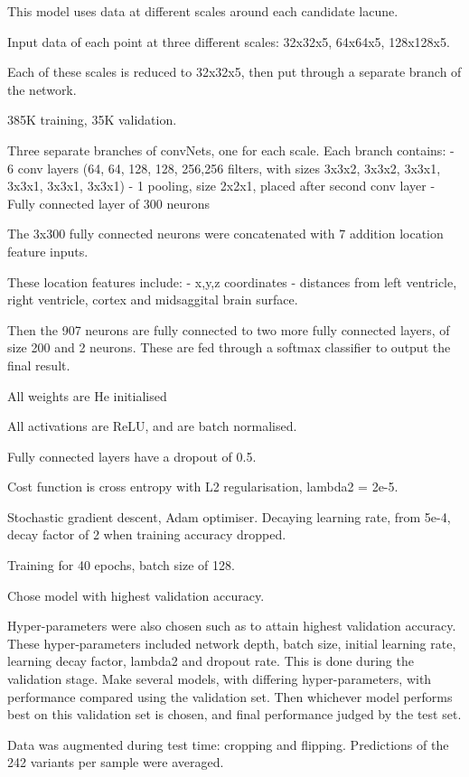 \documentclass[honours,12pt]{unswthesis}
\numberwithin{equation}{section}
\begin{document}
This model uses data at different scales around each candidate lacune. 

Input data of each point at three different scales: 32x32x5, 64x64x5, 128x128x5.

Each of these scales is reduced to 32x32x5, then put through a separate branch of the network.

385K training, 35K validation.

Three separate branches of convNets, one for each scale. Each branch contains:
 - 6 conv layers (64, 64, 128, 128, 256,256 filters, with sizes 3x3x2, 3x3x2, 3x3x1, 3x3x1, 3x3x1, 3x3x1)
 - 1 pooling, size 2x2x1, placed after second conv layer
 - Fully connected layer of 300 neurons
 
 The 3x300 fully connected neurons were concatenated with 7 addition location feature inputs.
 
 These location features include:
  - x,y,z coordinates
  - distances from left ventricle, right ventricle, cortex and midsaggital brain surface.

Then the 907 neurons are fully connected to two more fully connected layers, of size 200 and 2 neurons. 
These are fed through a softmax classifier to output the final result.

All weights are He initialised 

All activations are ReLU, and are batch normalised.

Fully connected layers have a dropout of 0.5.

Cost function is cross entropy with L2 regularisation, lambda2 = 2e-5. 

Stochastic gradient descent, Adam optimiser. Decaying learning rate, from 5e-4, decay factor of 2 when training accuracy dropped. 

Training for 40 epochs, batch size of 128.

Chose model with highest validation accuracy. 

Hyper-parameters were also chosen such as to attain highest validation accuracy. These hyper-parameters included network depth, batch size, initial learning rate, learning decay factor, lambda2 and dropout rate. This is done during the validation stage. Make several models, with differing hyper-parameters, with performance compared using the validation set. Then whichever model performs best on this validation set is chosen, and final performance judged by the test set.

Data was augmented during test time: cropping and flipping. Predictions of the 242 variants per sample were averaged.
\end{document}
